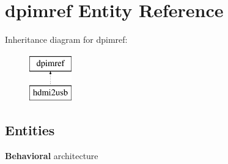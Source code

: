 \section{dpimref Entity Reference}
\label{classdpimref}
Inheritance diagram for dpimref\-:\begin{figure}[H]
\begin{center}
\leavevmode
\includegraphics[height=2.000000cm]{classdpimref}
\end{center}
\end{figure}
\subsection*{Entities}
\begin{DoxyCompactItemize}
\item 
{\bf Behavioral} architecture
\end{DoxyCompactItemize}
